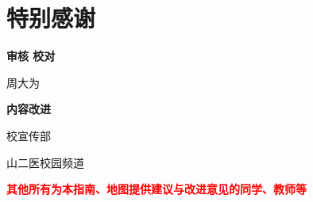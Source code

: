 \chapter*{特别感谢}
\noindent\begin{table*}[h]
    \centering
    \vspace{7em}

    {
        \large
        \textbf{审核 校对}
    }

    \vspace{.8em}
    周大为

    \vspace{3em}

    {
        \large
        \textbf{内容改进}
    }
    \vspace{.8em}

    校宣传部

    山二医校园频道

    \vspace{10em}
    {
        \large
        \textbf{\textcolor{red}{其他所有为本指南、地图提供建议与改进意见的同学、教师等}}
    }

\end{table*}